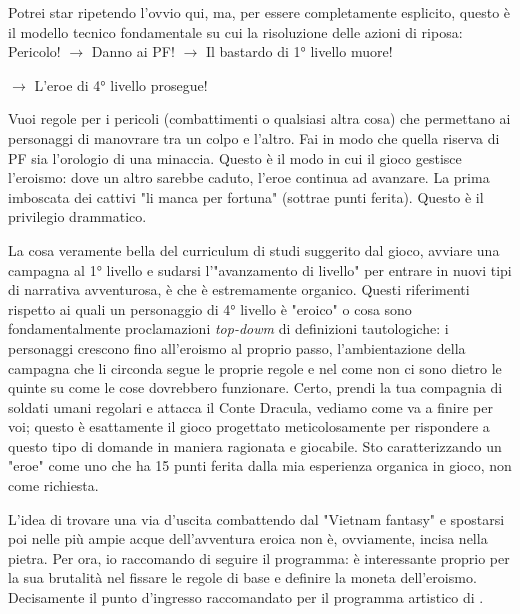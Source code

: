 
Potrei star ripetendo l'ovvio qui, ma, per essere completamente esplicito, questo è il modello tecnico fondamentale su cui la risoluzione delle azioni di \dnd{} riposa:\\
Pericolo! $\rightarrow$ Danno ai PF! \hfill$\rightarrow$ Il bastardo di 1° livello muore!

\hfill$\rightarrow$ L'eroe di 4° livello prosegue!

Vuoi regole per i pericoli (combattimenti o qualsiasi altra cosa) che permettano ai personaggi di manovrare tra un colpo e l'altro. Fai in modo che quella riserva di PF sia l'orologio di una minaccia. Questo è il modo in cui il gioco gestisce l'eroismo: dove un altro sarebbe caduto, l'eroe continua ad avanzare. La prima imboscata dei cattivi "li manca per fortuna" (sottrae punti ferita). Questo è il privilegio drammatico.


La cosa veramente bella del curriculum di studi suggerito dal gioco, avviare una campagna al 1° livello e sudarsi l'"avanzamento di livello" per entrare in nuovi tipi di narrativa avventurosa, è che è estremamente organico. Questi riferimenti rispetto ai quali un personaggio di 4° livello è "eroico" o cosa sono fondamentalmente proclamazioni \textit{top-dowm} di definizioni tautologiche: i personaggi crescono fino all'eroismo al proprio passo, l'ambientazione della campagna che li circonda segue le proprie regole e nel \dnd{} come  non ci sono dietro le quinte su come le cose dovrebbero funzionare. Certo, prendi la tua compagnia di soldati umani regolari e attacca il Conte Dracula, vediamo come va a finire per voi; questo è esattamente il gioco progettato meticolosamente per rispondere a questo tipo di domande in maniera ragionata e giocabile. Sto caratterizzando un "eroe" come uno che ha 15 punti ferita dalla mia esperienza organica in gioco, non come richiesta.

L'idea di trovare una via d'uscita combattendo dal "Vietnam fantasy" e spostarsi poi nelle più ampie acque dell'avventura eroica non è, ovviamente, incisa nella pietra. Per ora, io raccomando di seguire il programma: è interessante proprio per la sua brutalità nel fissare le regole di base e definire la moneta dell'eroismo. Decisamente il punto d'ingresso raccomandato per il programma artistico di \dnd{}.


